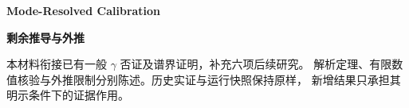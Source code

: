 \documentclass[11pt,a4paper]{article}
\theoremstyle{definition}
\begin{document}
\begin{center}
{\LARGE\bfseries Mode-Resolved Calibration}\par\medskip
{\Large\bfseries 剩余推导与外推}\par
\end{center}
\noindent 本材料衔接已有一般 $\gamma$ 否证及谱界证明，补充六项后续研究。
解析定理、有限数值核验与外推限制分别陈述。历史实证与运行快照保持原样，
新增结果只承担其明示条件下的证据作用。






\end{document}
